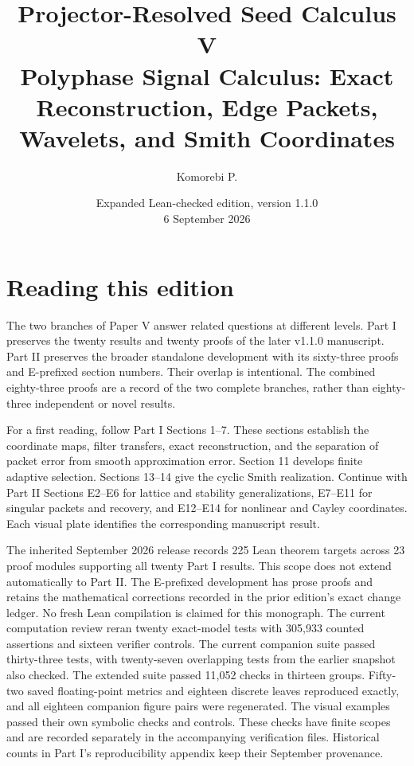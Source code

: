 \documentclass[11pt,letterpaper]{article}
\title{\textbf{Projector-Resolved Seed Calculus V}\\[0.45em]
\large Polyphase Signal Calculus: Exact Reconstruction, Edge Packets, Wavelets, and Smith Coordinates}
\author{Komorebi P.}
\date{Expanded Lean-checked edition, version 1.1.0\\\small 6 September 2026}
\theoremstyle{plain}
\theoremstyle{plain}
\theoremstyle{plain}
\theoremstyle{definition}
\theoremstyle{definition}
\theoremstyle{definition}
\theoremstyle{definition}
\theoremstyle{remark}
\theoremstyle{remark}
\theoremstyle{remark}
\theoremstyle{remark}
\begin{document}
\KomorebiCover
{}

\section*{Reading this edition}
The two branches of Paper V answer related questions at different levels. Part I preserves the twenty results and twenty proofs of the later v1.1.0 manuscript. Part II preserves the broader standalone development with its sixty-three proofs and E-prefixed section numbers. Their overlap is intentional. The combined eighty-three proofs are a record of the two complete branches, rather than eighty-three independent or novel results.

For a first reading, follow Part I Sections 1--7. These sections establish the coordinate maps, filter transfers, exact reconstruction, and the separation of packet error from smooth approximation error. Section 11 develops finite adaptive selection. Sections 13--14 give the cyclic Smith realization. Continue with Part II Sections E2--E6 for lattice and stability generalizations, E7--E11 for singular packets and recovery, and E12--E14 for nonlinear and Cayley coordinates. Each visual plate identifies the corresponding manuscript result.

The inherited September 2026 release records 225 Lean theorem targets across 23 proof modules supporting all twenty Part I results. This scope does not extend automatically to Part II. The E-prefixed development has prose proofs and retains the mathematical corrections recorded in the prior edition's exact change ledger. No fresh Lean compilation is claimed for this monograph. The current computation review reran twenty exact-model tests with 305,933 counted assertions and sixteen verifier controls. The current companion suite passed thirty-three tests, with twenty-seven overlapping tests from the earlier snapshot also checked. The extended suite passed 11,052 checks in thirteen groups. Fifty-two saved floating-point metrics and eighteen discrete leaves reproduced exactly, and all eighteen companion figure pairs were regenerated. The visual examples passed their own symbolic checks and controls. These checks have finite scopes and are recorded separately in the accompanying verification files. Historical counts in Part I's reproducibility appendix keep their September provenance.
\end{document}
